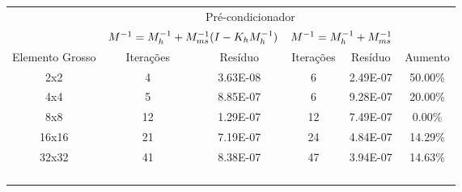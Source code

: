 \begin{table}[]
\begin{tabular}{cccccc}
\cline{2-5}
\multicolumn{1}{c|}{}                 & \multicolumn{4}{c|}{Pré-condicionador}                                                                                          &                              \\ \cline{2-5}
\multicolumn{1}{c|}{}                 & \multicolumn{2}{c|}{$M^{-1}=M^{-1}_{h} + M^{-1}_{ms}(I-K_hM^{-1}_{h})$}                             & \multicolumn{2}{c|}{$M^{-1}=M^{-1}_{h} + M^{-1}_{ms}$}                              &                              \\ \hline
\multicolumn{1}{|c|}{Elemento Grosso} & \multicolumn{1}{c|}{Iterações} & \multicolumn{1}{c|}{Resíduo}  & \multicolumn{1}{c|}{Iterações} & \multicolumn{1}{c|}{Resíduo}  & \multicolumn{1}{c|}{Aumento} \\ \hline
\multicolumn{1}{|c|}{2x2}             & \multicolumn{1}{c|}{4}         & \multicolumn{1}{c|}{3.63E-08} & \multicolumn{1}{c|}{6}         & \multicolumn{1}{c|}{2.49E-07} & \multicolumn{1}{c|}{50.00\%} \\ \hline
\multicolumn{1}{|c|}{4x4}             & \multicolumn{1}{c|}{5}         & \multicolumn{1}{c|}{8.85E-07} & \multicolumn{1}{c|}{6}         & \multicolumn{1}{c|}{9.28E-07} & \multicolumn{1}{c|}{20.00\%} \\ \hline
\multicolumn{1}{|c|}{8x8}             & \multicolumn{1}{c|}{12}        & \multicolumn{1}{c|}{1.29E-07} & \multicolumn{1}{c|}{12}        & \multicolumn{1}{c|}{7.49E-07} & \multicolumn{1}{c|}{0.00\%}  \\ \hline
\multicolumn{1}{|c|}{16x16}           & \multicolumn{1}{c|}{21}        & \multicolumn{1}{c|}{7.19E-07} & \multicolumn{1}{c|}{24}        & \multicolumn{1}{c|}{4.84E-07} & \multicolumn{1}{c|}{14.29\%} \\ \hline
\multicolumn{1}{|c|}{32x32}           & \multicolumn{1}{c|}{41}        & \multicolumn{1}{c|}{8.38E-07} & \multicolumn{1}{c|}{47}        & \multicolumn{1}{c|}{3.94E-07} & \multicolumn{1}{c|}{14.63\%} \\ \hline
\multicolumn{1}{l}{}                  & \multicolumn{1}{l}{}           & \multicolumn{1}{l}{}          & \multicolumn{1}{l}{}           & \multicolumn{1}{l}{}          & \multicolumn{1}{l}{}         \\
\multicolumn{1}{l}{}                  & \multicolumn{1}{l}{}           & \multicolumn{1}{l}{}          & \multicolumn{1}{l}{}           & \multicolumn{1}{l}{}          & \multicolumn{1}{l}{}         \\
\multicolumn{1}{l}{}                  & \multicolumn{1}{l}{}           & \multicolumn{1}{l}{}          & \multicolumn{1}{l}{}           & \multicolumn{1}{l}{}          & \multicolumn{1}{l}{}         \\
\multicolumn{1}{l}{}                  & \multicolumn{1}{l}{}           & \multicolumn{1}{l}{}          & \multicolumn{1}{l}{}           & \multicolumn{1}{l}{}          & \multicolumn{1}{l}{}        
\end{tabular}
\end{table}

